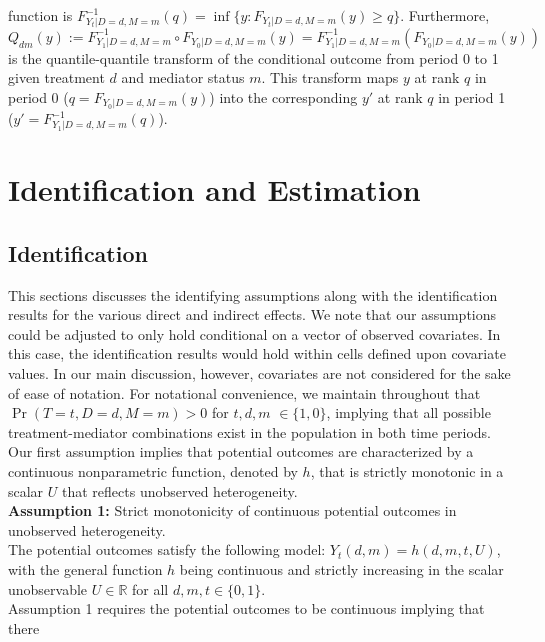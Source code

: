 \documentclass[a4paper,12pt]{article}
\begin{document}
 \doublespacing \pagestyle{plain}
function is $F_{Y_{t}|D=d,M=m}^{-1}(q) = \inf \{y : F_{Y_t|D=d,M=m}(y) \geq q \}$. Furthermore,
\begin{equation*}
Q_{dm}(y) := F_{Y_{1}|D=d,M=m}^{-1} \circ F_{Y_{0}|D=d,M=m}(y) = F_{Y_{1}|D=d,M=m}^{-1}(F_{Y_{0}|D=d,M=m}(y))
\end{equation*}
is the quantile-quantile transform of the conditional outcome from period 0 to 1 given treatment $d$ and mediator status $m$. This transform maps $y$ at rank $q$ in period 0 ($q = F_{Y_{0}|D=d,M=m}(y)$) into the corresponding $y'$ at rank $q$ in period 1 ($y'= F_{Y_{1}|D=d,M=m}^{-1}(q)$).
\section{Identification and Estimation}
\subsection{Identification}
This sections discusses the identifying assumptions along with the identification results for the various direct and indirect effects. We note that our assumptions could be adjusted to only hold conditional on a vector of observed covariates. In this case, the identification results would hold within cells defined upon covariate values. In our main discussion, however, covariates are not considered for the sake of ease of notation. For notational convenience, we maintain throughout that $\Pr(T=t, D=d, M=m)>0$ for $t,d,m$ $\in\{1,0\}$, implying that all possible treatment-mediator combinations exist in the population in both time periods. Our first assumption implies that potential outcomes are characterized by a continuous nonparametric function, denoted by $h$, that is strictly monotonic in a scalar $U$ that reflects unobserved heterogeneity.\vspace{5 pt}\\
\textbf{Assumption 1:} Strict monotonicity of continuous potential outcomes in unobserved heterogeneity.\\
The potential outcomes satisfy the following model: $Y_t(d,m)= h(d,m, t, U)$, with the general function $h$ being continuous and strictly increasing in the scalar unobservable $U \in \mathbb{R}$ for all $d,m,t \in \{0,1\}$.\vspace{5 pt}\\
Assumption 1 requires the potential outcomes to be continuous implying that there
\end{document}
